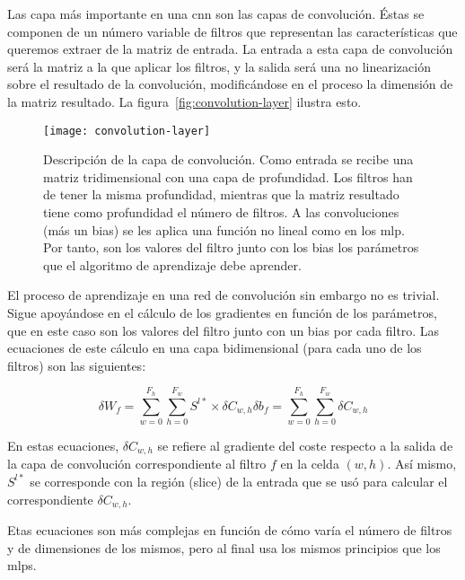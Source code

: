 Las capa más importante en una \ac{cnn} son las capas de convolución. Éstas se componen de un número variable de filtros que representan las características que queremos extraer de la matriz de entrada. La entrada a esta capa de convolución será la matriz a la que aplicar los filtros, y la salida será una no linearización sobre el resultado de la convolución, modificándose en el proceso la dimensión de la matriz resultado. La figura~\ref{fig:convolution-layer} ilustra esto.

\begin{figure}[!b]
	\centering
	\texttt{[image: convolution-layer]}
	\caption[Descripción de la capa de convolución]{Descripción de la capa de convolución. Como entrada se recibe una matriz tridimensional con una capa de profundidad. Los filtros han de tener la misma profundidad, mientras que la matriz resultado tiene como profundidad el número de filtros. A las convoluciones (más un bias) se les aplica una función no lineal como en los \ac{mlp}. Por tanto, son los valores del filtro junto con los bias los parámetros que el algoritmo de aprendizaje debe aprender.}
	\label{fig:cnn-gconvolutional-layer}
\end{figure}

El proceso de aprendizaje en una red de convolución sin embargo no es trivial. Sigue apoyándose en el cálculo de los gradientes en función de los parámetros, que en este caso son los valores del filtro junto con un bias por cada filtro. Las ecuaciones de este cálculo en una capa bidimensional (para cada uno de los filtros) son las siguientes:

\begin{subequations}
	\begin{equation}
		\delta W_f = \sum_{w=0}^{F_h} \sum_{h=0}^{F_w} S^{l*} \times \delta C_{w,h} \label{eq:cnn-error-weights}
	\end{equation}
	\begin{equation}
		\delta b_f = \sum_{w=0}^{F_h} \sum_{h=0}^{F_w} \delta C_{w,h} \label{eq:cnn-error-biases}
	\end{equation}
\end{subequations}

En estas ecuaciones, $\delta C_{w,h}$ se refiere al gradiente del coste respecto a la salida de la capa de convolución correspondiente al filtro $f$ en la celda $(w, h)$. Así mismo, $S^{l*}$ se corresponde con la región (slice) de la entrada que se usó para calcular el correspondiente $\delta C_{w,h}$.

Etas ecuaciones son más complejas en función de cómo varía el número de filtros y de dimensiones de los mismos, pero al final usa los mismos principios que los \acp{mlp}.

